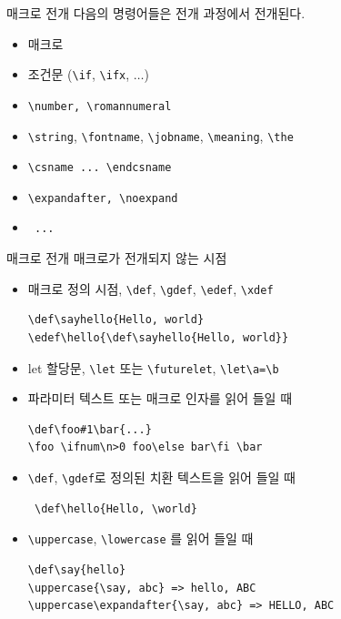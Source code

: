 \documentclass{beamer}
\begin{document}
%
\begin{frame}[fragile]{매크로 전개}
  다음의 명령어들은 전개 과정에서 전개된다.
  \begin{itemize}
  \item 매크로
  \item 조건문 (\verb+\if+, \verb+\ifx+, $\ldots$)
  \item \verb+\number, \romannumeral+
  \item \verb+\string+, \verb+\fontname+, \verb+\jobname+,
    \verb+\meaning+, \verb+\the+
  \item \verb+\csname ... \endcsname+
  \item \verb+\expandafter, \noexpand+
  \item \verb+ ... +
  \end{itemize}
\end{frame}


%
\begin{frame}[fragile]{매크로 전개}
  매크로가 전개되지 않는 시점
  \begin{itemize}
  \item 매크로 정의 시점, \verb+\def+, \verb+\gdef+, \verb+\edef+, \verb+\xdef+
    {\small
\begin{verbatim}
\def\sayhello{Hello, world}
\edef\hello{\def\sayhello{Hello, world}}
\end{verbatim}}
  \item let 할당문, \verb+\let+ 또는 \verb+\futurelet+, \verb+\let\a=\b+
  \item 파라미터 텍스트 또는 매크로 인자를 읽어 들일 때
    {\small
\begin{verbatim}
\def\foo#1\bar{...}
\foo \ifnum\n>0 foo\else bar\fi \bar
\end{verbatim}}
  \item \verb+\def+, \verb+\gdef+로 정의된 치환 텍스트을 읽어 들일 때
  {\small \begin{verbatim} \def\hello{Hello, \world}\end{verbatim}}
  \item \verb+\uppercase+, \verb+\lowercase+ 를 읽어 들일 때
    {\small \begin{verbatim}
\def\say{hello}
\uppercase{\say, abc} => hello, ABC
\uppercase\expandafter{\say, abc} => HELLO, ABC  
\end{verbatim}}
  \end{itemize}
\end{frame}
\end{document}
